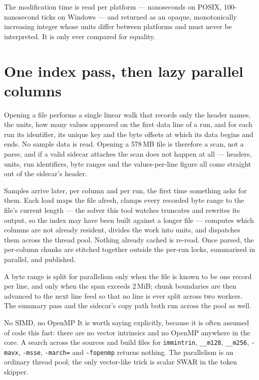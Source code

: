 \documentclass[11pt,a4paper,oneside]{report}
\newcommand{\code}[1]{\texttt{#1}}
\begin{document}
The modification time is read per platform --- nanoseconds on POSIX,
100-nanosecond ticks on Windows --- and returned as an opaque, monotonically
increasing integer whose units differ between platforms and must never be
interpreted. It is only ever compared for equality.

\section{One index pass, then lazy parallel columns}

Opening a file performs a single linear walk that records only the header names,
the units, how many values appeared on the first data line of a run, and for each
run its identifier, its unique key and the byte offsets at which its data begins
and ends. No sample data is read. Opening a 578\,MB file is therefore a scan, not
a parse, and if a valid sidecar attaches the scan does not happen at all ---
headers, units, run identifiers, byte ranges and the values-per-line figure all
come straight out of the sidecar's header.

Samples arrive later, per column and per run, the first time something asks for
them. Each load maps the file afresh, clamps every recorded byte range to the
file's current length --- the solver this tool watches truncates and rewrites its
output, so the index may have been built against a longer file --- computes which
columns are not already resident, divides the work into units, and dispatches
them across the thread pool. Nothing already cached is re-read. Once parsed, the
per-column chunks are stitched together outside the per-run locks, summarised in
parallel, and published.

A byte range is split for parallelism only when the file is known to be one
record per line, and only when the span exceeds 2\,MiB; chunk boundaries are then
advanced to the next line feed so that no line is ever split across two workers.
The summary pass and the sidecar's copy path both run across the pool as well.

\begin{aoenote}{No SIMD, no OpenMP}
It is worth saying explicitly, because it is often assumed of code this fast:
there are no vector intrinsics and no OpenMP anywhere in the core. A search
across the sources and build files for \code{immintrin}, \code{\_\_m128},
\code{\_\_m256}, \code{-mavx}, \code{-msse}, \code{-march=} and
\code{-fopenmp} returns nothing. The parallelism is an ordinary thread pool; the
only vector-like trick is scalar SWAR in the token skipper.
\end{aoenote}
\end{document}
